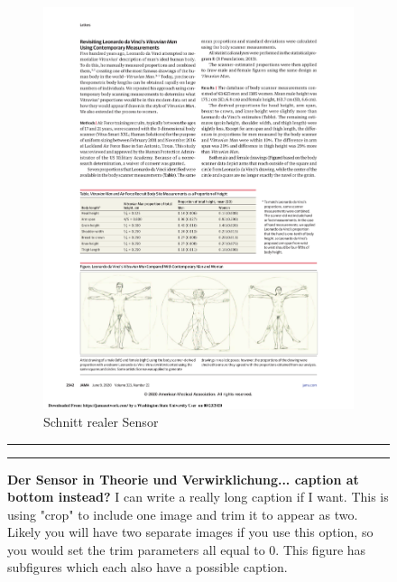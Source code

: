 \documentclass[]{article}
\begin{document}
\begin{figure}[!ht]
\begin{subfigure}[h]{0.5\textwidth}
        \includegraphics[trim = 11.25cm 0 0 0,clip,scale=1]{figures/Vitruvian.pdf}
            \caption{Schnitt realer Sensor \citep{Thomas:2020}}
        \label{fig:sub-second}
    \end{subfigure}
    \vspace{2.5mm}
    \hrule
    \vspace{2.5mm}
        \caption{\textbf{ Der Sensor in Theorie und Verwirklichung... caption at bottom instead? }  I can write a really long caption if I want. \newline This is using "crop" to include one image and trim it to appear as two.  Likely you will have two separate images if you use this option, so you would set the trim parameters all equal to 0.  \newline   This figure has subfigures which each also have a possible caption.   }
        \label{fig:combined}
    \vspace{-2.5mm}
    \hrule
\end{figure}
\end{document}
